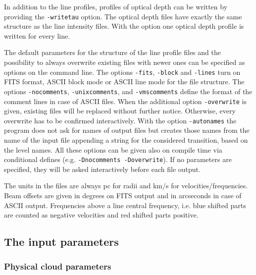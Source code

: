 In addition to the line profiles, profiles of optical depth can
be written by providing the {\tt -writetau} option. The optical
depth files have exactly the same structure as the line intensity files.
With the option one optical depth profile is written for every line.

The default parameters for the structure of the line profile files
and the possibility to always overwrite existing files with newer
ones can be specified as options on the command line.
The options {\tt -fits}, {\tt -block} and {\tt -lines} turn on FITS
format, ASCII block mode or ASCII line 
mode for the file structure. The options {\tt -nocomments}, 
{\tt -unixcomments}, and {\tt -vmscomments} define the format of the 
comment lines in case of ASCII files.
When the additional option {\tt -overwrite} is given, existing files 
will be replaced without further notice. Otherwise, every overwrite 
has to be confirmed interactively.
With the option {\tt -autonames} the program does not ask for names of
output files but creates those names from the name of the input file
appending a string for the considered transition, based on the level names.
All these options can be given also on compile time via conditional
defines (e.g. {\tt -Dnocomments -Doverwrite}). 
If no parameters are specified, they will be asked interactively before
each file output. 

The units in the files are always pc for radii and km/s for
velocities/frequencies. Beam offsets are given in degrees on FITS 
output and in arcseconds in case of ASCII output. 
Frequencies above a line central frequency, i.e. blue
shifted parts are counted as negative velocities and red shifted parts
positive.

\subsection{The input parameters}

\subsubsection{Physical cloud parameters}

